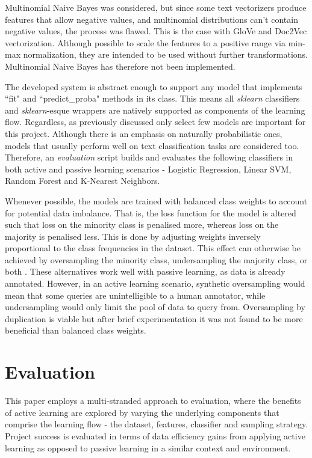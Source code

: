 \documentclass[a4paper,12pt]{article}
\begin{document}
Multinomial Naive Bayes was considered, but since some text vectorizers produce features that allow negative values, and multinomial distributions can't contain negative values, the process was flawed. This is the case with GloVe and Doc2Vec vectorization. Although possible to scale the features to a positive range via min-max normalization, they are intended to be used without further transformations. Multinomial Naive Bayes has therefore not been implemented.
    
The developed system is abstract enough to support any model that implements ``fit" and ``predict\_proba" methods in its class. This means all \emph{sklearn}\cite{scikit-learn} classifiers and \emph{sklearn}-esque wrappers are natively supported as components of the learning flow. Regardless, as previously discussed only select few models are important for this project. Although there is an emphasis on naturally probabilistic ones, models that usually perform well on text classification tasks are considered too. Therefore, an \emph{evaluation} script builds and evaluates the following classifiers in both active and passive learning scenarios - Logistic Regression, Linear SVM, Random Forest and K-Nearest Neighbors.

Whenever possible, the models are trained with balanced class weights to account for potential data imbalance. That is, the loss function for the model is altered such that loss on the minority class is penalised more, whereas loss on the majority is penalised less. This is done by adjusting weights inversely proportional to the class frequencies in the dataset. This effect can otherwise be achieved by oversampling the minority class, undersampling the majority class, or both \cite{Chawla02smote:synthetic}. These alternatives work well with passive learning, as data is already annotated. However, in an active learning scenario, synthetic oversampling would mean that some queries are unintelligible to a human annotator, while undersampling would only limit the pool of data to query from. Oversampling by duplication is viable but after brief experimentation it was not found to be more beneficial than balanced class weights.
\newpage
\section{Evaluation}
This paper employs a multi-stranded approach to evaluation, where the benefits of active learning are explored by varying the underlying components that comprise the learning flow - the dataset, features, classifier and sampling strategy.
Project success is evaluated in terms of data efficiency gains from applying active learning as opposed to passive learning in a similar context and environment.
\end{document}
